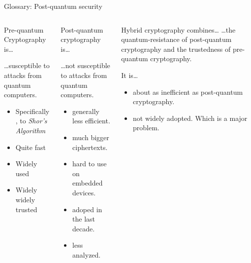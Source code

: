 \begin{frame}{Glossary: Post-quantum security}
\hypertarget{pqc-glossary}{}
\vspace{-\ht\strutbox}
  \begin{columns}[t]
    \begin{column}{.30\linewidth}
      \begin{block}{Pre-quantum Cryptography is… \strut}

      …susceptible to attacks from quantum computers.

      \vspace{0.5em}
      \begin{itemize}
        \item Specifically, to \emph{Shor's Algorithm} %
        \item Quite fast
        \item Widely used
        \item Widely widely trusted
      \end{itemize}
      \end{block}
    \end{column}

    \begin{column}{.33\linewidth}
      \begin{block}{Post-quantum cryptography is…}

        …not susceptible to attacks from quantum computers.

      \vspace{0.5em}
      \begin{itemize}
        \item generally less efficient.
        \item much bigger ciphertexts.
        \item hard to use on embedded devices.
        \item adoped in the last decade.
        \item less analyzed.
      \end{itemize}
      \end{block}
    \end{column}

    \begin{column}{.36\linewidth}
      \begin{block}{Hybrid cryptography combines…}
        …the quantum-resistance of post-quantum cryptography
        and the trustedness of pre-quantum cryptography.

        \vspace{0.7em} It is…

        \vspace{0.3em}
        \begin{itemize}
          \item about as inefficient as post-quantum cryptography.
          \item not widely adopted. Which is a major problem.
        \end{itemize}
      \end{block}
    \end{column}
  \end{columns}
\end{frame}


